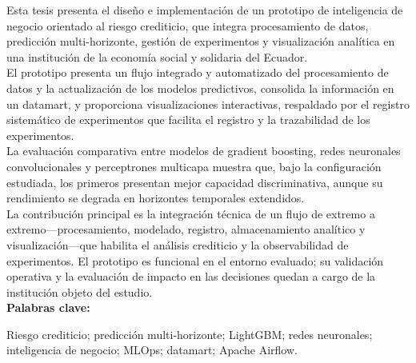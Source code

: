 Esta tesis presenta el diseño e implementación de un prototipo de inteligencia de negocio orientado al riesgo crediticio, que integra procesamiento de datos, predicción multi-horizonte, gestión de experimentos y visualización analítica en una institución de la economía social y solidaria del Ecuador.\\

El prototipo presenta un flujo integrado y automatizado del procesamiento de datos y la actualización de los modelos predictivos, consolida la información en un datamart, y proporciona visualizaciones interactivas, respaldado por el registro sistemático de experimentos que facilita el registro y la trazabilidad de los experimentos.\\

La evaluación comparativa entre modelos de gradient boosting, redes neuronales convolucionales y perceptrones multicapa muestra que, bajo la configuración estudiada, los primeros presentan mejor capacidad discriminativa, aunque su rendimiento se degrada en horizontes temporales extendidos.\\

La contribución principal es la integración técnica de un flujo de extremo a extremo—procesamiento, modelado, registro, almacenamiento analítico y visualización—que habilita el análisis crediticio y la observabilidad de experimentos. El prototipo es funcional en el entorno evaluado; su validación operativa y la evaluación de impacto en las decisiones quedan a cargo de la institución objeto del estudio.\\

\noindent\textbf{Palabras clave:}

Riesgo crediticio; predicción multi-horizonte; LightGBM; redes neuronales; inteligencia de negocio; MLOps; datamart; Apache Airflow.